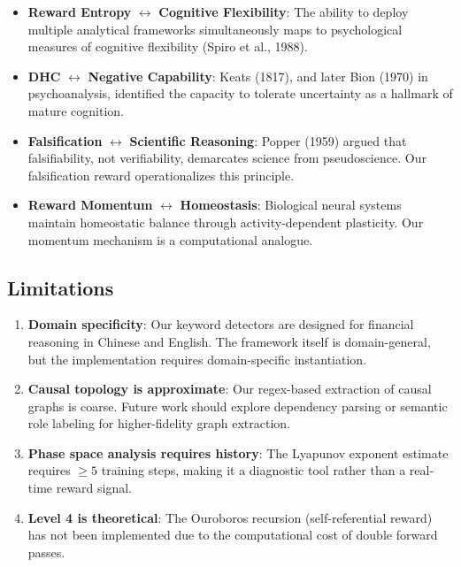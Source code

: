 \documentclass{article}
\begin{document}
\begin{itemize}
    \item \textbf{Reward Entropy} $\leftrightarrow$ \textbf{Cognitive Flexibility}: The ability to deploy multiple analytical frameworks simultaneously maps to psychological measures of cognitive flexibility (Spiro et al., 1988).
    
    \item \textbf{DHC} $\leftrightarrow$ \textbf{Negative Capability}: Keats (1817), and later Bion (1970) in psychoanalysis, identified the capacity to tolerate uncertainty as a hallmark of mature cognition.
    
    \item \textbf{Falsification} $\leftrightarrow$ \textbf{Scientific Reasoning}: Popper (1959) argued that falsifiability, not verifiability, demarcates science from pseudoscience. Our falsification reward operationalizes this principle.
    
    \item \textbf{Reward Momentum} $\leftrightarrow$ \textbf{Homeostasis}: Biological neural systems maintain homeostatic balance through activity-dependent plasticity. Our momentum mechanism is a computational analogue.
\end{itemize}

\subsection{Limitations}

\begin{enumerate}
    \item \textbf{Domain specificity}: Our keyword detectors are designed for financial reasoning in Chinese and English. The framework itself is domain-general, but the implementation requires domain-specific instantiation.
    
    \item \textbf{Causal topology is approximate}: Our regex-based extraction of causal graphs is coarse. Future work should explore dependency parsing or semantic role labeling for higher-fidelity graph extraction.
    
    \item \textbf{Phase space analysis requires history}: The Lyapunov exponent estimate requires $\geq 5$ training steps, making it a diagnostic tool rather than a real-time reward signal.
    
    \item \textbf{Level 4 is theoretical}: The Ouroboros recursion (self-referential reward) has not been implemented due to the computational cost of double forward passes.
\end{enumerate}
\end{document}
